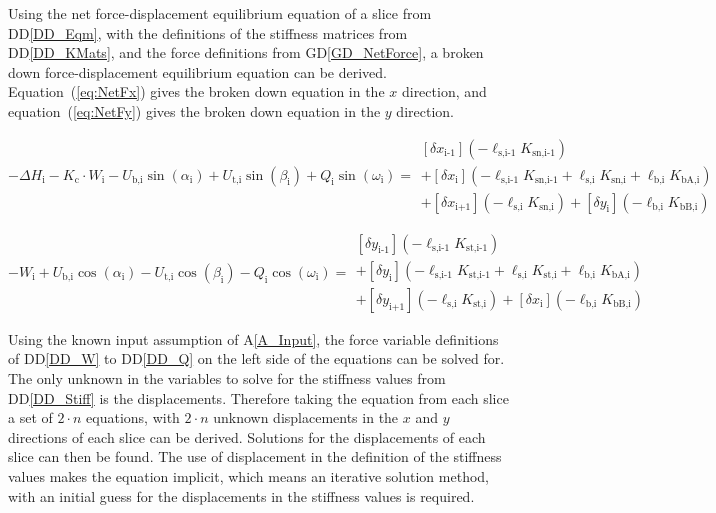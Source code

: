 \documentclass[12pt]{article}
\newcommand{\aref}[1]{A\ref{#1}}
\newcommand{\ddref}[1]{DD\ref{#1}}
\newcommand{\dref}[1]{GD\ref{#1}}
\begin{document}
Using the net force-displacement equilibrium equation of a slice from
\ddref{DD_Eqm}, with the definitions of the stiffness matrices from
\ddref{DD_KMats}, and the force definitions from \dref{GD_NetForce}, a
broken down force-displacement equilibrium equation can be
derived. Equation~(\ref{eq:NetFx}) gives the broken down equation in
the $x$ direction, and equation~(\ref{eq:NetFy}) gives the broken down
equation in the $y$ direction.

\begin{equation}\label{eq:NetFx}
-\Delta H_\text{i} -K_{\text{c}} \cdot W_\text{i} - U_{\text{b,i}}
\sin\left(\alpha_\text{i}\right) + U_{\text{t,i}}
\sin\left(\beta_\text{i}\right) + Q_\text{i}
\sin\left(\omega_\text{i}\right) = \begin{array}{l} \left[ \delta
    x_{\text{i-1}} \right] \left( - \ell_{\text{s,i-1}}
  K_{\text{sn,i-1}} \right) \\ + \left[ \delta x_{\text{i}} \right]
  \left( - \ell_{\text{s,i-1}} K_{\text{sn,i-1}} + \ell_{\text{s,i}}
  K_{\text{sn,i}} + \ell_{\text{b,i}} K_{\text{bA,i}} \right) \\ +
  \left[ \delta x_{\text{i+1}} \right] \left( - \ell_{\text{s,i}}
  K_{\text{sn,i}} \right) + \left[ \delta y_{\text{i}} \right] \left(
  - \ell_{\text{b,i}} K_{\text{bB,i}} \right)
  \end{array}
\end{equation}


\begin{equation}\label{eq:NetFy}
-W_\text{i} + U_{\text{b,i}} \cos\left(\alpha_\text{i}\right) -
U_{\text{t,i}} \cos\left(\beta_\text{i}\right) - Q_{\text{i}}
\cos\left(\omega_\text{i}\right) = \begin{array}{l} \left[ \delta
    y_{\text{i-1}} \right] \left( - \ell_{\text{s,i-1}}
  K_{\text{st,i-1}} \right) \\ + \left[ \delta y_{\text{i}} \right]
  \left( - \ell_{\text{s,i-1}} K_{\text{st,i-1}} + \ell_{\text{s,i}}
  K_{\text{st,i}} + \ell_{\text{b,i}} K_{\text{bA,i}} \right) \\ +
  \left[ \delta y_{\text{i+1}} \right] \left( - \ell_{\text{s,i}}
  K_{\text{st,i}} \right) + \left[ \delta x_{\text{i}} \right] \left(
  - \ell_{\text{b,i}} K_{\text{bB,i}} \right)
 \end{array}
\end{equation}

\noindent
Using the known input assumption of \aref{A_Input}, the force variable
definitions of \ddref{DD_W} to \ddref{DD_Q} on the left side of the
equations can be solved for. The only unknown in the variables to
solve for the stiffness values from \ddref{DD_Stiff} is the
displacements. Therefore taking the equation from each slice a set of
$2 \cdot n$ equations, with $2 \cdot n$ unknown displacements in the
$x$ and $y$ directions of each slice can be derived. Solutions for
the displacements of each slice can then be found. The use of
displacement in the definition of the stiffness values makes the
equation implicit, which means an iterative solution method, with an
initial guess for the displacements in the stiffness values is
required.
\end{document}
